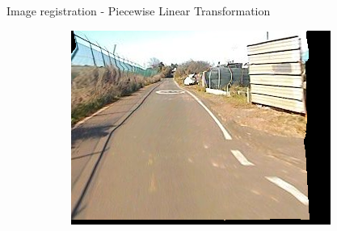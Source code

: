 \begin{frame}{Image registration - Piecewise Linear Transformation}
\begin{figure}[h!]
\begin{subfigure}[b]{0.3\textwidth}
	    \includegraphics[width=\textwidth]{transformed}
    \end{subfigure}%
  \end{figure}
\end{frame}

